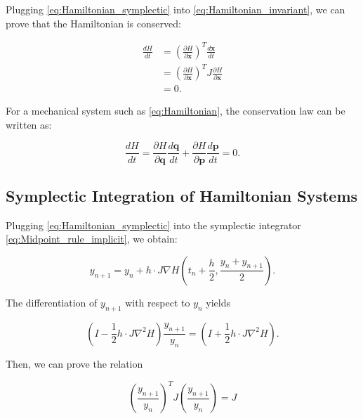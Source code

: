 \documentclass[
	parskip, 			   %
	twoside, 			   %
	DIV=14, 			   %
	BCOR=15.0mm, 		   %
	headsepline, 		   %
	open=right, 		   %
	captions=tableheading, %
	bibliography=totoc,    %
	numbers=noenddot       %
]{scrreprt}
\begin{document}
Plugging \ref{eq:Hamiltonian_symplectic} into \ref{eq:Hamiltonian_invariant}, we can prove that the Hamiltonian is conserved:

\begin{equation}
    \label{eq:Hamiltonian_symplectic_conclusion}
    \begin{aligned}
        \frac{dH}{dt} &= (\frac{\partial H}{\partial \mathbf{x}})^T \frac{d\mathbf{x}}{dt}\\
         &= (\frac{\partial H}{\partial \mathbf{x}})^T J \frac{\partial H}{\partial \mathbf{x}} \\
         &= 0.
    \end{aligned}
\end{equation}


For a mechanical system such as \ref{eq:Hamiltonian}, the conservation law can be written as:

\begin{equation}
    \label{eq:Hamiltonian_invariant_in_mechaniacal_system}
    \frac{dH}{dt} = \frac{\partial H}{\partial \mathbf{q}} \frac{d \mathbf{q}}{dt} + \frac{\partial H}{\partial \mathbf{p}} \frac{d \mathbf{p}}{dt} = 0.
\end{equation}

\subsection{Symplectic Integration of Hamiltonian Systems}
Plugging \ref{eq:Hamiltonian_symplectic} into the symplectic integrator \ref{eq:Midpoint_rule_implicit}, we obtain:

\begin{equation}
    \label{eq:Midpoint_rule_implicit_Hamiltonian}
    y_{n+1} = y_{n} + h \cdot J \nabla H (t_{n}+\frac{h}{2} ,\frac{y_{n} + y_{n+1}}{2}).
\end{equation}

The differentiation of $y_{n+1}$ with respect to $y_{n}$ yields

\begin{equation}
    \label{eq:Midpoint_rule_implicit_Hamiltonian_differentiation}
    (I - \frac{1}{2} h \cdot J \nabla^2 H) \frac{y_{n+1}}{y_{n}} = (I + \frac{1}{2} h \cdot J \nabla^2 H).
\end{equation}

Then, we can prove the relation

\begin{equation}
    \label{eq:Midpoint_rule_implicit_symplecticity}
    (\frac{y_{n+1}}{y_{n}})^T J (\frac{y_{n+1}}{y_{n}}) = J
\end{equation}
\end{document}
